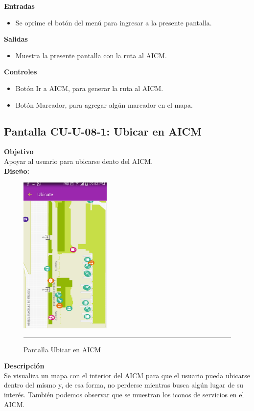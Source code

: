 \textbf{Entradas}
\begin{itemize}
\item Se oprime el botón del menú para ingresar a la presente pantalla.
\end{itemize}

\textbf{Salidas}
\begin{itemize}
\item Muestra la presente pantalla con la ruta al AICM.
\end{itemize}

\textbf{Controles}
\begin{itemize}
\item Botón Ir a AICM, para generar la ruta al AICM.
\item Botón Marcador, para agregar algún marcador en el mapa.
\end{itemize}

\clearpage
\hypertarget{CU-U-08-1}{}
\subsection{Pantalla CU-U-08-1: Ubicar en AICM}
\textbf{Objetivo}\\
Apoyar al usuario para ubicarse dento del AICM. \\

\textbf{Diseño:}
\begin{figure}[h]
	\centering
		\includegraphics[width=0.4\textwidth]{Figuras/intUbicarAICM.png}
		\rule{30em}{0.5pt}
	\caption[Pantalla Ubicar en AICM]{Pantalla Ubicar en AICM}
	\label{fig:intUbicarAICM}
\end{figure}

\textbf{Descripción} \\
Se visualiza un mapa con el interior del AICM para que el usuario pueda ubicarse dentro del mismo y, de esa forma, no perderse mientras busca algún lugar de su interés. También podemos observar que se muestran los iconos de servicios en el AICM. \\


